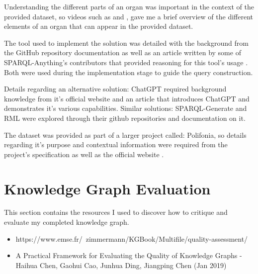 Understanding the different parts of an organ was important in the context of the provided dataset, so videos such as \cite{organvideo} and \cite{organvideo1}, gave me a brief overview of the different elements of an organ that can appear in the provided dataset. 

The tool used to implement the solution was detailed with the background from the GitHub repository documentation \cite{sparqlanythinggithub} as well as an article written by some of SPARQL-Anything's contributors that provided reasoning for this tool's usage \cite{sparqlanything}. Both were used during the implementation stage to guide the query construction. 

Details regarding an alternative solution: ChatGPT required background knowledge from it's official website \cite{chatgptwebsite} and an article that introduces ChatGPT and demonstrates it's various capabilities\cite{chatgpt}. Similar solutions: SPARQL-Generate \cite{sparqlgenerate} and RML \cite{rml} were explored through their github repositories and documentation on it.  

The dataset was provided as part of a larger project called: Polifonia, so details regarding it's purpose and contextual information were required from the project's specification \cite{polifoniaproject} as well as the official website \cite{polifonia}. 

\section{Knowledge Graph Evaluation}
\hspace{0.5cm} This section contains the resources I used to discover how to critique and evaluate my completed knowledge graph. 
\begin{itemize}
\item https://www.emse.fr/~zimmermann/KGBook/Multifile/quality-assessment/
\item A Practical Framework for Evaluating the Quality of Knowledge Graphs - Haihua Chen, Gaohui Cao, Junhua Ding, Jiangping Chen (Jan 2019)
\end{itemize}
